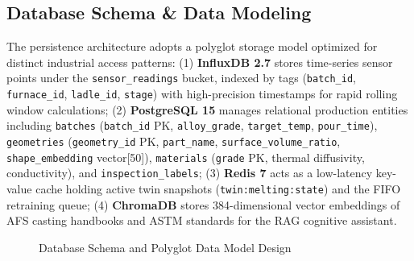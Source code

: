 \documentclass[11pt, a4paper]{article}
\begin{document}
\subsection{Database Schema \& Data Modeling}
\noindent
The persistence architecture adopts a polyglot storage model optimized for distinct industrial access patterns:
(1) \textbf{InfluxDB 2.7} stores time-series sensor points under the \texttt{sensor\_readings} bucket, indexed by tags (\texttt{batch\_id}, \texttt{furnace\_id}, \texttt{ladle\_id}, \texttt{stage}) with high-precision timestamps for rapid rolling window calculations;
(2) \textbf{PostgreSQL 15} manages relational production entities including \texttt{batches} (\texttt{batch\_id} PK, \texttt{alloy\_grade}, \texttt{target\_temp}, \texttt{pour\_time}), \texttt{geometries} (\texttt{geometry\_id} PK, \texttt{part\_name}, \texttt{surface\_volume\_ratio}, \texttt{shape\_embedding} vector[50]), \texttt{materials} (\texttt{grade} PK, thermal diffusivity, conductivity), and \texttt{inspection\_labels};
(3) \textbf{Redis 7} acts as a low-latency key-value cache holding active twin snapshots (\texttt{twin:melting:state}) and the FIFO retraining queue;
(4) \textbf{ChromaDB} stores 384-dimensional vector embeddings of AFS casting handbooks and ASTM standards for the RAG cognitive assistant.

\begin{figure}[H]
    \centering
    \caption{Database Schema and Polyglot Data Model Design}
\end{figure}
\end{document}
